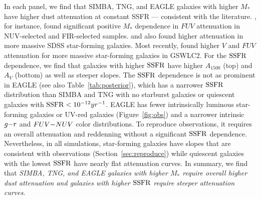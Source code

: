 In each panel, we find that SIMBA, TNG, and EAGLE galaxies with higher
$M_*$ have higher dust attenuation at constant SSFR --- consistent with the literature.
\cite{burgarella2005}, for instance, found significant positive $M_*$
dependence in $FUV$ attenuation in NUV-selected and FIR-selected samples. 
\cite{garn2010} and \cite{battisti2016} also found higher attenuation in
more massive SDSS star-forming galaxies. 
Most recently, \cite{salim2018} found higher $V$ and $FUV$ attenuation for
more massive star-forming galaxies in GSWLC2. 
For the ${\rm SSFR}$ dependence, we find that galaxies with higher ${\rm SSFR}$ have
higher $A_{1500}$ (top) and $A_V$ (bottom) as well as steeper slopes. 
The ${\rm SSFR}$ dependence is not as prominent in EAGLE (see also
Table~\ref{tab:posterior}), which has a narrower ${\rm SSFR}$ distribution than
SIMBA and TNG with no starburst galaxies or quiescent galaxies with ${\rm SSFR} <
10^{-12}yr^{-1}$. 
EAGLE has fewer intrinsically luminous star-forming galaxies
or UV-red galaxies (Figure~\ref{fig:obs}) and a narrower intrinsic $g{-}r$
and $FUV{-}NUV$ color distributions. 
To reproduce observations, it requires an overall attenuation and reddenning
without a significant ${\rm SSFR}$ dependence. 
Nevertheless, in all simulations, star-forming galaxies have slopes that
are consistent with observations (Section~\ref{sec:reproduce}) while
quiescent galaxies with the lowest ${\rm SSFR}$ have nearly flat attenuation
curves. 
In summary, we find that \emph{SIMBA, TNG, and EAGLE galaxies with higher
$M_*$ require overall higher dust attenuation and galaxies with higher
${\rm SSFR}$ require steeper attenuation curves}.

